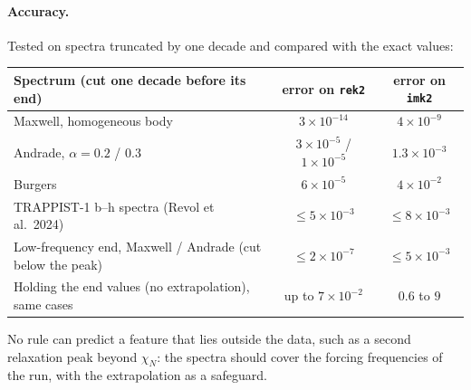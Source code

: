 \paragraph{Accuracy.} Tested on spectra truncated by one decade and compared with the exact values:
\begin{center}\small
\begin{tabular}{lcc}\toprule
Spectrum (cut one decade before its end) & error on \texttt{rek2} & error on \texttt{imk2}\\\midrule
Maxwell, homogeneous body & $3\times10^{-14}$ & $4\times10^{-9}$\\
Andrade, $\alpha=0.2$ / $0.3$ & $3\times10^{-5}$ / $1\times10^{-5}$ & $1.3\times10^{-3}$\\
Burgers & $6\times10^{-5}$ & $4\times10^{-2}$\\
TRAPPIST-1 b--h spectra (Revol et al.\ 2024) & $\le5\times10^{-3}$ & $\le8\times10^{-3}$\\
Low-frequency end, Maxwell / Andrade (cut below the peak) & $\le2\times10^{-7}$ & $\le5\times10^{-3}$\\
Holding the end values (no extrapolation), same cases & up to $7\times10^{-2}$ & $0.6$ to $9$\\\bottomrule
\end{tabular}
\end{center}
No rule can predict a feature that lies outside the data, such as a second relaxation peak beyond $\chi_N$: the spectra should cover the forcing frequencies of the run, with the extrapolation as a safeguard.

